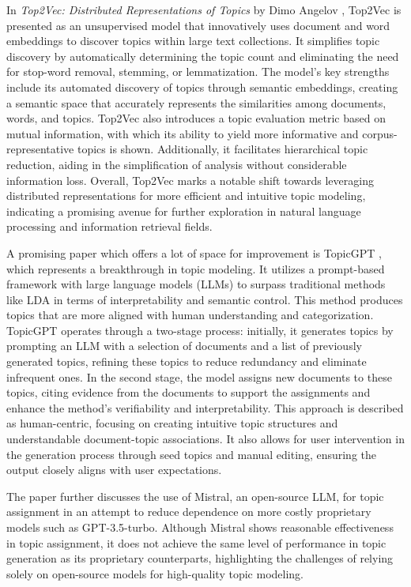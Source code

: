 \documentclass[fleqn,moreauthors,10pt]{ds_report}
\begin{document}
In \textit{Top2Vec: Distributed Representations of Topics} by Dimo Angelov \cite{angelov2020top2vec}, Top2Vec is presented as an unsupervised model that innovatively uses document and word embeddings to discover topics within large text collections. It simplifies topic discovery by automatically determining the topic count and eliminating the need for stop-word removal, stemming, or lemmatization. The model's key strengths include its automated discovery of topics through semantic embeddings, creating a semantic space that accurately represents the similarities among documents, words, and topics. Top2Vec also introduces a topic evaluation metric based on mutual information, with which its ability to yield more informative and corpus-representative topics is shown. Additionally, it facilitates hierarchical topic reduction, aiding in the simplification of analysis without considerable information loss. Overall, Top2Vec marks a notable shift towards leveraging distributed representations for more efficient and intuitive topic modeling, indicating a promising avenue for further exploration in natural language processing and information retrieval fields.

A promising paper which offers a lot of space for improvement is TopicGPT \cite{pham2023topicgpt}, which represents a breakthrough in topic modeling. It utilizes a prompt-based framework with large language models (LLMs) to surpass traditional methods like LDA in terms of interpretability and semantic control. This method produces topics that are more aligned with human understanding and categorization. TopicGPT operates through a two-stage process: initially, it generates topics by prompting an LLM with a selection of documents and a list of previously generated topics, refining these topics to reduce redundancy and eliminate infrequent ones. In the second stage, the model assigns new documents to these topics, citing evidence from the documents to support the assignments and enhance the method's verifiability and interpretability. This approach is described as human-centric, focusing on creating intuitive topic structures and understandable document-topic associations. It also allows for user intervention in the generation process through seed topics and manual editing, ensuring the output closely aligns with user expectations. 

The paper further discusses the use of Mistral, an open-source LLM, for topic assignment in an attempt to reduce dependence on more costly proprietary models such as GPT-3.5-turbo. Although Mistral shows reasonable effectiveness in topic assignment, it does not achieve the same level of performance in topic generation as its proprietary counterparts, highlighting the challenges of relying solely on open-source models for high-quality topic modeling. 
\end{document}
